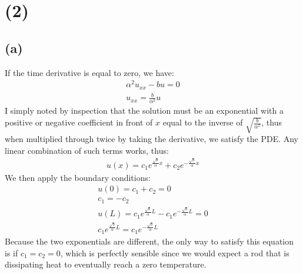 \documentclass{article}
\begin{document}
\section*{\textbf{(2)}}
\subsection*{\textbf{(a)}}
If the time derivative is equal to zero, we have:
\begin{equation}
\begin{aligned}
\alpha^2u_{xx} - bu = 0\\
u_{xx} = \frac{b}{\alpha^2}u
\end{aligned}
\end{equation}
I simply noted by inspection that the solution must be an exponential with a positive or negative coefficient in front of $x$ equal to the inverse of $\sqrt{\frac{b}{\alpha^2}}$, thus when multiplied through twice by taking the derivative, we satisfy the PDE. Any linear combination of such terms works, thus:
\begin{equation}
\begin{aligned}
u(x) = c_1e^{\frac{\sqrt{b}}{\alpha}x} + c_2e^{-\frac{\sqrt{b}}{\alpha}x}
\end{aligned}
\end{equation}
We then apply the boundary conditions:
\begin{equation}
\begin{aligned}
u(0) = c_1 + c_2 = 0\\
c_1 = -c_2\\
u(L) = c_1e^{\frac{\sqrt{b}}{\alpha}L} -c_1e^{-\frac{\sqrt{b}}{\alpha}L} = 0\\
c_1e^{\frac{\sqrt{b}}{\alpha}L} =c_1e^{-\frac{\sqrt{b}}{\alpha}L} 
\end{aligned}
\end{equation}
Because the two exponentials are different, the only way to satisfy this equation is if $c_1 = c_2 = 0$, which is perfectly sensible since we would expect a rod that is dissipating heat to eventually reach a zero temperature.
\end{document}
